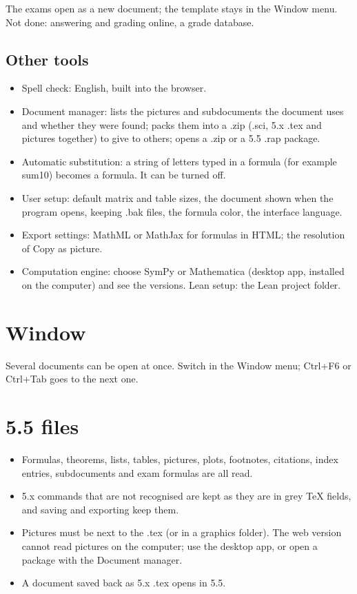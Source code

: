 The exams open as a new document; the template stays in the Window menu. Not done: answering and grading online, a grade database.

\subsection{Other tools}

\begin{itemize}
\item Spell check: English, built into the browser.
\item Document manager: lists the pictures and subdocuments the document uses and whether they were found; packs them into a .zip (.sci, 5.x .tex and pictures together) to give to others; opens a .zip or a 5.5 .rap package.
\item Automatic substitution: a string of letters typed in a formula (for example sum10) becomes a formula. It can be turned off.
\item User setup: default matrix and table sizes, the document shown when the program opens, keeping .bak files, the formula color, the interface language.
\item Export settings: MathML or MathJax for formulas in HTML; the resolution of Copy as picture.
\item Computation engine: choose SymPy or Mathematica (desktop app, installed on the computer) and see the versions. Lean setup: the Lean project folder.
\end{itemize}

\section{Window}

Several documents can be open at once. Switch in the Window menu; Ctrl+F6 or Ctrl+Tab goes to the next one.

\section{5.5 files}

\begin{itemize}
\item Formulas, theorems, lists, tables, pictures, plots, footnotes, citations, index entries, subdocuments and exam formulas are all read.
\item 5.x commands that are not recognised are kept as they are in grey TeX fields, and saving and exporting keep them.
\item Pictures must be next to the .tex (or in a graphics folder). The web version cannot read pictures on the computer; use the desktop app, or open a package with the Document manager.
\item A document saved back as 5.x .tex opens in 5.5.
\end{itemize}

